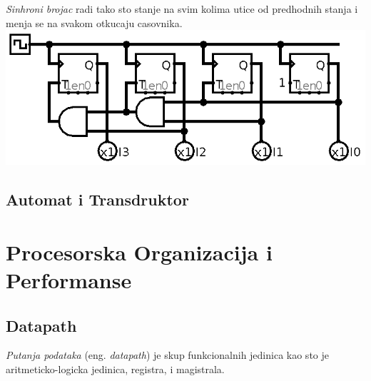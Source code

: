 \documentclass[12p,a4paper]{article}
\begin{document}
\begin{multicols}{2}
    \emph{Sinhroni brojac} radi tako sto stanje na svim kolima utice od 
    predhodnih stanja i menja se na svakom otkucaju casovnika.
    \includegraphics[width=\columnwidth]{Figures/sinhroni.png}

    \subsection{Automat i Transdruktor}

    \section{Procesorska Organizacija i Performanse}

    \subsection{Datapath}
        
    \emph{Putanja podataka} (eng. \emph{datapath}) je skup funkcionalnih 
    jedinica kao sto je aritmeticko-logicka jedinica, registra, i magistrala.


\end{multicols}
\end{document}
